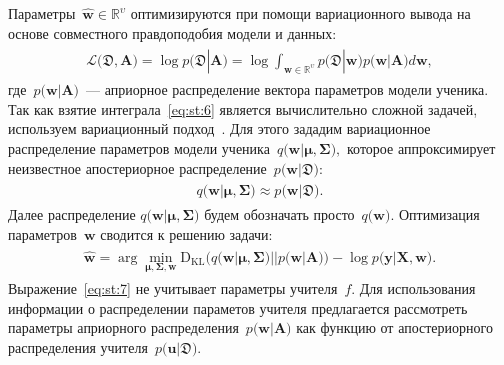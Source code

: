 \documentclass[12pt]{a&t}
\begin{document}
Параметры~$\hat{\mathbf{w}} \in \mathbb{R}^{\upsilon}$ оптимизируются при помощи вариационного вывода на основе совместного правдоподобия модели и данных:
\begin{gather}
\label{eq:st:6}
\begin{aligned}
\mathcal{L}\bigr(\mathfrak{D}, \mathbf{A}\bigr) = \log p\bigr(\mathfrak{D}|\mathbf{A}\bigr) = \log \int_{\mathbf{w} \in \mathbb{R}^{\upsilon}}p\bigr(\mathfrak{D}|\mathbf{w}\bigr)p\bigr(\mathbf{w}|\mathbf{A}\bigr)d\mathbf{w},
\end{aligned}
\end{gather}
где~$p\bigr(\mathbf{w}| \mathbf{A}\bigr)$~--- априорное распределение вектора параметров модели ученика.
Так как взятие интеграла~\eqref{eq:st:6} является вычислительно сложной задачей, используем вариационный подход~\cite{graves2011, grabovoy2019}. Для этого зададим вариационное распределение параметров модели ученика~$q\bigr(\mathbf{w}|\bm{\mu}, \bm{\Sigma}\bigr),$ которое аппроксимирует неизвестное апостериорное распределение~$p\bigr(\mathbf{w}|\mathfrak{D}\bigr):$
\begin{gather}
\label{eq:st:new:1}
\begin{aligned}
q\bigr(\mathbf{w}|\bm{\mu}, \bm{\Sigma}\bigr) \approx  p\bigr(\mathbf{w}|\mathfrak{D}\bigr).
\end{aligned}
\end{gather}
Далее распределение $q\bigr(\mathbf{w}|\bm{\mu}, \bm{\Sigma}\bigr)$ будем обозначать просто~$q\bigr(\mathbf{w}\bigr).$ Оптимизация параметров~$\mathbf{w}$ сводится к решению  задачи:
\begin{gather}
\label{eq:st:7}
\begin{aligned}
\hat{\mathbf{w}} = \arg \min_{\bm{\mu}, \bm{\Sigma}, \mathbf{w}} \text{D}_{\text{KL}}\bigr(q\bigr(\mathbf{w}|\bm{\mu}, \bm{\Sigma}\bigr)||p\bigr(\mathbf{w}|\mathbf{A}\bigr)\bigr) - \log p\bigr(\mathbf{y}|\mathbf{X}, \mathbf{w}\bigr).
\end{aligned}
\end{gather}
Выражение~\eqref{eq:st:7} не учитывает параметры учителя~$f$. Для использования информации о распределении параметов учителя предлагается рассмотреть параметры априорного распределения~$p\bigr(\mathbf{w}|\mathbf{A}\bigr)$ как функцию от апостериорного распределения учителя~$p\bigr(\mathbf{u}|\mathfrak{D}\bigr)$.
\end{document}
